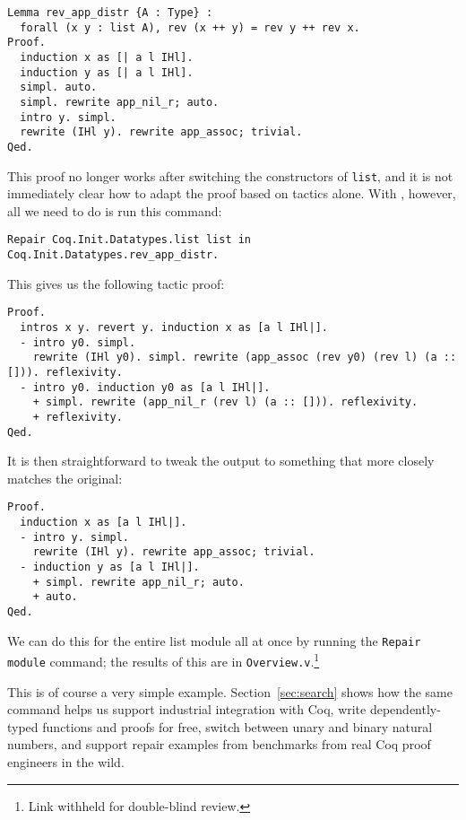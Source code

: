 \begin{lstlisting}
Lemma rev_app_distr {A : Type} :
  forall (x y : list A), rev (x ++ y) = rev y ++ rev x.
Proof.
  induction x as [| a l IHl].
  induction y as [| a l IHl].
  simpl. auto.
  simpl. rewrite app_nil_r; auto.
  intro y. simpl.
  rewrite (IHl y). rewrite app_assoc; trivial.
Qed.
\end{lstlisting}
This proof no longer works after switching the constructors of \lstinline{list},
and it is not immediately clear how to adapt the proof based on tactics alone.
With \toolname, however, all we need to do is run this command: %

\begin{lstlisting}
Repair Coq.Init.Datatypes.list list in Coq.Init.Datatypes.rev_app_distr.
\end{lstlisting}
This gives us the following tactic proof:

\begin{lstlisting}
Proof.
  intros x y. revert y. induction x as [a l IHl|].
  - intro y0. simpl.
    rewrite (IHl y0). simpl. rewrite (app_assoc (rev y0) (rev l) (a :: [])). reflexivity.
  - intro y0. induction y0 as [a l IHl|].
    + simpl. rewrite (app_nil_r (rev l) (a :: [])). reflexivity.
    + reflexivity.
Qed.
\end{lstlisting}
It is then straightforward to tweak the output to something
that more closely matches the original:

\begin{lstlisting}
Proof.
  induction x as [a l IHl|].
  - intro y. simpl.
    rewrite (IHl y). rewrite app_assoc; trivial.
  - induction y as [a l IHl|].
    + simpl. rewrite app_nil_r; auto.
    + auto.
Qed.
\end{lstlisting}

We can do this for the entire list module all at once by running the \lstinline{Repair module}
command; the results of this are in \lstinline{Overview.v}.\footnote{Link withheld for double-blind review.}

This is of course a very simple example. Section~\ref{sec:search} shows how the same command
helps us support industrial integration with Coq, write dependently-typed functions and proofs for free,
switch between unary and binary natural numbers, and support repair examples from benchmarks
from real Coq proof engineers in the wild.



